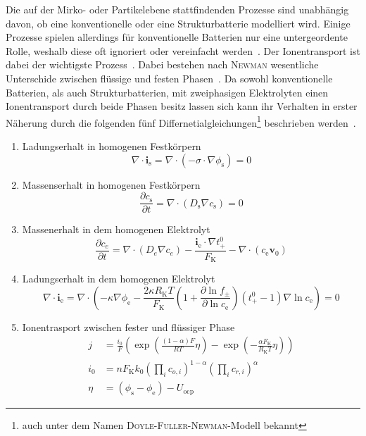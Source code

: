 Die auf der Mirko- oder Partikelebene stattfindenden Prozesse sind unabhängig davon, ob eine konventionelle oder eine Strukturbatterie modelliert wird. Einige Prozesse spielen allerdings für konventionelle Batterien nur eine untergeordente Rolle, weshalb diese oft ignoriert oder vereinfacht werden~\cite{Carlstedt2020a}. Der Ionentransport ist dabei der wichtigste Prozess~\cite{Carlstedt2019b}. Dabei bestehen nach \textsc{Newman} wesentliche Unterschide zwischen flüssige und festen Phasen~\cite{Newman2021}. Da sowohl  konventionelle Batterien, als auch Strukturbatterien, mit zweiphasigen Elektrolyten einen Ionentransport durch beide Phasen besitz lassen sich kann ihr Verhalten in erster Näherung durch die folgenden fünf Differnetialgleichungen\footnote{auch unter dem Namen \textsc{Doyle}-\textsc{Fuller}-\textsc{Newman}-Modell bekannt} beschrieben werden~\cite{Plett2015}.
\begin{enumerate}
    \item Ladungserhalt in homogenen Festkörpern
    \begin{equation}
        \nabla \cdot \boldsymbol{i}_{\text{s}} = \nabla \cdot \left( - \sigma \cdot \nabla \phi_{\text{s}} \right) = 0
    \end{equation}

    \item Massenserhalt in homogenen Festkörpern
    \begin{equation}
        \frac{\partial c_{\text{s}}}{\partial t}  = \nabla \cdot \left( D_{\text{s}} \nabla c_{\text{s}} \right) = 0
    \end{equation}

    \item Massenerhalt in dem homogenen Elektrolyt
    \begin{equation}
        \frac{\partial c_e}{\partial t} = \nabla \cdot \left( D_e   \nabla c_e \right) - \frac{\boldsymbol{i}_{\text{e}} \cdot    \nabla t_+^0}{F_{\text{K}}} - \nabla \cdot \left( c_{\text{e}} \boldsymbol{v}_0\right)
    \end{equation}

    \item Ladungserhalt  in dem homogenen Elektrolyt
    \begin{equation}
        \nabla \cdot \boldsymbol{i}_{\text{e}} = \nabla \cdot \left(    - \kappa \nabla \phi_{\text{e}}  -\frac{2\kappa R_{\text{K}} T}{F_{\text{K}}} \left(  1+ \frac{\partial \ln f_\pm}{\partial \ln c_{\text{e}}}\right)   \left( t_+^0-1\right) \nabla \ln c_{\text{e}} \right) = 0
    \end{equation}

    \item Ionentrasport zwischen fester und flüssiger Phase
    \begin{align}
        j &= \frac{i_0}{F}\left( \exp \left(\frac{\left(1-\alpha\right)  F}{RT}\eta \right) - \exp \left(-\frac{\alpha F_{\text{K}}}{R_{\text{K}} T}  \eta\right) \right)\\
        i_0 &= n F_{\text{K}} k_0 \left(\prod_i c_{o,i}\right)^{1-\alpha} \left( \prod_i c_{r,i}\right)^\alpha\\
        \eta &= (\phi_{\text{s}}-\phi_{\text{e}}) - U_{\text{ocp}}
    \end{align}
\end{enumerate}
